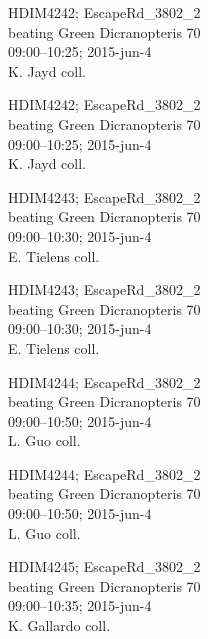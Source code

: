 \documentclass[6pt]{article}
\begin{document}
\noindent
\parbox{0.135\textwidth}{\tiny HDIM4242; EscapeRd\_3802\_2\\ beating Green Dicranopteris 70\\ 09:00--10:25; 2015-jun-4\\ K. Jayd coll.}
\parbox{0.135\textwidth}{\tiny HDIM4242; EscapeRd\_3802\_2\\ beating Green Dicranopteris 70\\ 09:00--10:25; 2015-jun-4\\ K. Jayd coll.}
\parbox{0.135\textwidth}{\tiny HDIM4243; EscapeRd\_3802\_2\\ beating Green Dicranopteris 70\\ 09:00--10:30; 2015-jun-4\\ E. Tielens coll.}
\parbox{0.135\textwidth}{\tiny HDIM4243; EscapeRd\_3802\_2\\ beating Green Dicranopteris 70\\ 09:00--10:30; 2015-jun-4\\ E. Tielens coll.}
\parbox{0.135\textwidth}{\tiny HDIM4244; EscapeRd\_3802\_2\\ beating Green Dicranopteris 70\\ 09:00--10:50; 2015-jun-4\\ L. Guo coll.}
\parbox{0.135\textwidth}{\tiny HDIM4244; EscapeRd\_3802\_2\\ beating Green Dicranopteris 70\\ 09:00--10:50; 2015-jun-4\\ L. Guo coll.}
\parbox{0.135\textwidth}{\tiny HDIM4245; EscapeRd\_3802\_2\\ beating Green Dicranopteris 70\\ 09:00--10:35; 2015-jun-4\\ K. Gallardo coll.} \\ 
\vspace{0.001in} 
\end{document}
